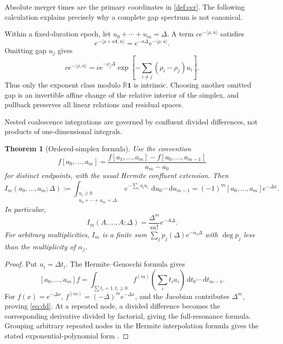 \documentclass[11pt]{article}
\newtheorem{theorem}{Theorem}[section]
\newcommand{\R}{\mathbb R}
\newcommand{\one}{\mathbf 1}
\newcommand{\dd}{\,\mathrm d}
\begin{document}
Absolute merger times are the primary coordinates in \cref{def:ccr}.  The following calculation explains precisely why a complete gap spectrum is not canonical.

Within a fixed-duration epoch, let $u_0+\cdots+u_m=\Delta$.  A term $ce^{-\langle\rho,u\rangle}$ satisfies
\[
e^{-\langle\rho+a\one,u\rangle}=e^{-a\Delta}e^{-\langle\rho,u\rangle}.
\]
Omitting gap $u_j$ gives
\begin{equation}
ce^{-\langle\rho,u\rangle}
=ce^{-\rho_j\Delta}
 \exp\!\left[-\sum_{i\ne j}(\rho_i-\rho_j)u_i\right].
\label{eq:reduced-gap}
\end{equation}
Thus only the exponent class modulo $\R\one$ is intrinsic.  Choosing another omitted gap is an invertible affine change of the relative interior of the simplex, and pullback preserves all linear relations and residual spaces.

Nested coalescence integrations are governed by confluent divided differences, not products of one-dimensional integrals.

\begin{theorem}[Ordered-simplex formula]
\label{thm:divided-difference}
Use the convention
\[
f[a_0,\ldots,a_m]
=\frac{f[a_1,\ldots,a_m]-f[a_0,\ldots,a_{m-1}]}{a_m-a_0}
\]
for distinct endpoints, with the usual Hermite confluent extension.  Then
\begin{equation}
I_m(a_0,\ldots,a_m;\Delta)
:=\int_{\substack{u_i\ge0\\u_0+\cdots+u_m=\Delta}}
 e^{-\sum_i a_iu_i}\,\dd u_0\cdots\dd u_{m-1}
=(-1)^m[a_0,\ldots,a_m]e^{-\Delta x}.
\label{eq:dd}
\end{equation}
In particular,
\[
I_m(A,\ldots,A;\Delta)=\frac{\Delta^m}{m!}e^{-A\Delta}.
\]
For arbitrary multiplicities, $I_m$ is a finite sum $\sum_j p_j(\Delta)e^{-\alpha_j\Delta}$ with $\deg p_j$ less than the multiplicity of $\alpha_j$.
\end{theorem}

\begin{proof}
Put $u_i=\Delta t_i$.  The Hermite--Genocchi formula gives
\[
[a_0,\ldots,a_m]f
=\int_{\sum t_i=1,t_i\ge0}f^{(m)}\!\left(\sum_i t_ia_i\right)\dd t_0\cdots\dd t_{m-1}.
\]
For $f(x)=e^{-\Delta x}$, $f^{(m)}=(-\Delta)^me^{-\Delta x}$, and the Jacobian contributes $\Delta^m$, proving \eqref{eq:dd}.  At a repeated node, a divided difference becomes the corresponding derivative divided by factorial, giving the full-resonance formula.  Grouping arbitrary repeated nodes in the Hermite interpolation formula gives the stated exponential-polynomial form \citep{deBoor2005}.
\end{proof}
\end{document}

